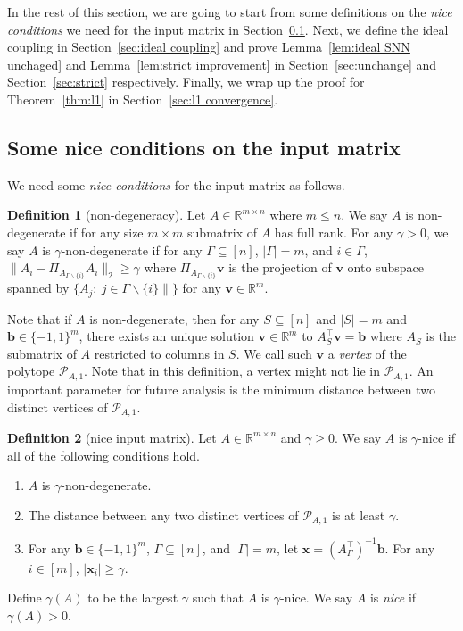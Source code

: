 \documentclass[11pt]{article}
\theoremstyle{remark}
\theoremstyle{definition}
\newtheorem{definition}{Definition}
\newcommand{\bx}{\mathbf{x}}
\newcommand{\bb}{\mathbf{b}}
\newcommand{\bv}{\mathbf{v}}
\newcommand{\R}{{\mathbb R}} %
\begin{document}
In the rest of this section, we are going to start from some definitions on the \textit{nice conditions} we need for the input matrix in Section~\ref{sec:nice}. Next, we define the ideal coupling in Section~\ref{sec:ideal coupling} and prove Lemma~\ref{lem:ideal SNN unchaged} and Lemma~\ref{lem:strict improvement} in Section~\ref{sec:unchange} and Section~\ref{sec:strict} respectively. Finally, we wrap up the proof for Theorem~\ref{thm:l1} in Section~\ref{sec:l1 convergence}.


\subsection{Some nice conditions on the input matrix}\label{sec:nice}
We need some \textit{nice conditions} for the input matrix as follows.
\begin{definition}[non-degeneracy]
	Let $A\in\R^{m\times n}$ where $m\leq n$. We say $A$ is non-degenerate if for any size $m\times m$ submatrix of $A$ has full rank. For any $\gamma>0$, we say $A$ is $\gamma$-non-degenerate if for any $\Gamma\subseteq[n]$, $|\Gamma|=m$, and $i\in\Gamma$, $\|A_i-\Pi_{A_{\Gamma\backslash\{i\}}}A_i\|_2\geq\gamma$ where $\Pi_{A_{\Gamma\backslash\{i\}}}\bv$ is the projection of $\bv$ onto subspace spanned by $\{A_j:\ j\in\Gamma\backslash\{i\}\|\}$ for any $\bv\in\R^m$.
\end{definition}

Note that if $A$ is non-degenerate, then for any $S\subseteq[n]$ and $|S|=m$ and $\bb\in\{-1,1\}^m$, there exists an unique solution $\bv\in\R^m$ to $A_S^\top\bv=\bb$ where $A_S$ is the submatrix of $A$ restricted to columns in $S$. We call such $\bv$ a \textit{vertex} of the polytope $\mathcal{P}_{A,1}$. Note that in this definition, a vertex might not lie in $\mathcal{P}_{A,1}$. An important parameter for future analysis is the minimum distance between two distinct vertices of $\mathcal{P}_{A,1}$.


\begin{definition}[nice input matrix]\label{def:nice}
	Let $A\in\R^{m\times n}$ and $\gamma\geq0$. We say $A$ is $\gamma$-nice if all of the following conditions hold.
	\begin{enumerate}[label=(\arabic*)]
		\item $A$ is $\gamma$-non-degenerate.
		\item The distance between any two distinct vertices of $\mathcal{P}_{A,1}$ is at least $\gamma$.
		\item For any $\bb\in\{-1,1\}^m$, $\Gamma\subseteq[n]$, and $|\Gamma|=m$, let $\bx=(A_\Gamma^\top)^{-1}\bb$. For any $i\in[m]$, $|\bx_i|\geq\gamma$.
	\end{enumerate}
	Define $\gamma(A)$ to be the largest $\gamma$ such that $A$ is $\gamma$-nice. We say $A$ is \textit{nice} if $\gamma(A)>0$.
\end{definition}
\end{document}
